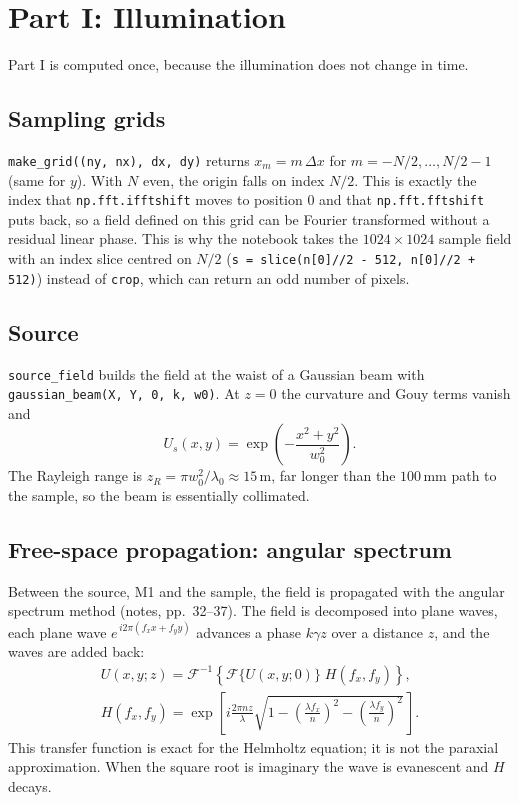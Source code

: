 \documentclass[11pt,a4paper]{article}
\newcommand{\FT}{\mathcal{F}}
\newcommand{\mm}{\,\mathrm{mm}}
\newcommand{\ee}{e}
\newcommand{\code}[1]{\texttt{\small #1}}
\begin{document}
\section{Part I: Illumination}
\label{sec:illum}

Part I is computed once, because the illumination does not change in time.

\subsection{Sampling grids}
\label{sec:grids}

\code{make\_grid((ny, nx), dx, dy)} returns
$x_m = m\,\Delta x$ for $m = -N/2,\dots,N/2-1$ (same for $y$). With $N$ even,
the origin falls on index $N/2$. This is exactly the index that
\code{np.fft.ifftshift} moves to position 0 and that \code{np.fft.fftshift}
puts back, so a field defined on this grid can be Fourier transformed without
a residual linear phase. This is why the notebook takes the $1024\times1024$
sample field with an index slice centred on $N/2$ (\code{s = slice(n[0]//2 -
512, n[0]//2 + 512)}) instead of \code{crop}, which can return an odd number
of pixels.

\subsection{Source}
\label{sec:source}

\code{source\_field} builds the field at the waist of a Gaussian beam with
\code{gaussian\_beam(X, Y, 0, k, w0)}. At $z=0$ the curvature and Gouy terms
vanish and
\begin{equation}
  U_s(x,y) = \exp\!\left(-\frac{x^2+y^2}{w_0^2}\right).
  \label{eq:gauss}
\end{equation}
The Rayleigh range is $z_R = \pi w_0^2/\lambda_0 \approx 15\,$m, far longer than
the $100\mm$ path to the sample, so the beam is essentially collimated.

\subsection{Free-space propagation: angular spectrum}
\label{sec:as}

Between the source, M1 and the sample, the field is propagated with the
angular spectrum method (notes, pp.~32--37). The field is decomposed into
plane waves, each plane wave $\ee^{\,i2\pi(f_xx+f_yy)}$ advances a phase
$k\gamma z$ over a distance $z$, and the waves are added back:
\begin{gather}
  U(x,y;z) = \FT^{-1}\!\left\{\FT\{U(x,y;0)\}\;H(f_x,f_y)\right\},
  \nonumber\\
  H(f_x,f_y) = \exp\!\left[i\frac{2\pi n z}{\lambda}
     \sqrt{1-\left(\frac{\lambda f_x}{n}\right)^2-\left(\frac{\lambda f_y}{n}\right)^2}\,\right].
  \label{eq:AS}
\end{gather}
This transfer function is exact for the Helmholtz equation; it is not the
paraxial approximation. When the square root is imaginary the wave is
evanescent and $H$ decays.
\end{document}
